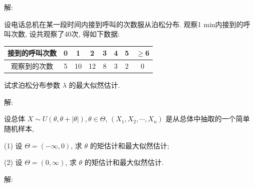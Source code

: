 \documentclass[standard]{ExBook}
\begin{document}
\begin{qitems}
\vspace{-5em}

    \begin{bbox}
解: 
    \end{bbox}

\vspace{-5em}

    \begin{bbox}
    \begin{shaded}
        \qitem
设电话总机在某一段时间内接到呼叫的次数服从泊松分布. 观察1 min内接到的呼叫次数, 设共观察了40次, 得如下数据:

\begin{center}
\setlength{\tabcolsep}{21pt}
\begin{tabular}{c|ccccccc}
\hline
接到的呼叫次数 & 0 & 1 & 2 & 3 & 4 & 5 & \(\geq\)6 \\
\hline
观察到的次数 & 5 & 10 & 12 & 8 & 3 & 2 & 0 \\
\hline
\end{tabular}
\end{center}

试求泊松分布参数 \(\lambda\) 的最大似然估计.
    \end{shaded}
    \end{bbox}

\vspace{-5em}

    \begin{bbox}
解: 
    \end{bbox}

\vspace{-5em}

    \begin{bbox}
    \begin{shaded}
        \qitem
设总体 \(X \sim U(\theta, \theta + |\theta|), \theta \in \Theta\), \((X_1, X_2, \cdots, X_n)\) 是从总体中抽取的一个简单随机样本,

(1) 设 \(\Theta = (-\infty, 0)\), 求 \(\theta\) 的矩估计和最大似然估计;

(2) 设 \(\Theta = (0, \infty)\), 求 \(\theta\) 的矩估计和最大似然估计.
    \end{shaded}
    \end{bbox}

\vspace{-5em}

    \begin{bbox}
解: 
    \end{bbox}

\vspace{-5em}


\end{qitems}
\end{document}
